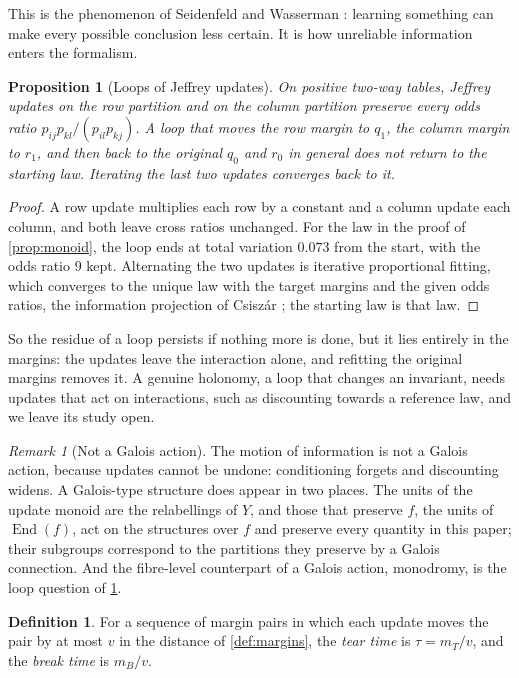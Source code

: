 \documentclass[11pt]{article}
\newtheorem{proposition}[theorem]{Proposition}
\theoremstyle{definition}
\newtheorem{definition}[theorem]{Definition}
\theoremstyle{remark}
\newtheorem{remark}[theorem]{Remark}
\begin{document}
This is the phenomenon of Seidenfeld and Wasserman \cite{SeidenfeldWasserman1993}: learning something can make every
possible conclusion less certain. It is how unreliable information enters the formalism.

\begin{proposition}[Loops of Jeffrey updates]\label{prop:loop}
On positive two-way tables, Jeffrey updates on the row partition and on the column partition preserve every odds ratio
$p_{ij}p_{kl}/(p_{il}p_{kj})$. A loop that moves the row margin to $q_1$, the column margin to $r_1$, and then back to the
original $q_0$ and $r_0$ in general does not return to the starting law. Iterating the last two updates converges back to it.
\end{proposition}
\begin{proof}
A row update multiplies each row by a constant and a column update each column, and both leave cross ratios unchanged. For
the law in the proof of \cref{prop:monoid}, the loop ends at total variation $0.073$ from the start, with the odds ratio $9$ kept.
Alternating the two updates is iterative proportional fitting, which converges to the unique law with the target margins and the
given odds ratios, the information projection of Csiszár \cite{Csiszar1975}; the starting law is that law.
\end{proof}

So the residue of a loop persists if nothing more is done, but it lies entirely in the margins: the updates leave the interaction
alone, and refitting the original margins removes it. A genuine holonomy, a loop
that changes an invariant, needs updates that act on interactions, such as discounting towards a reference law, and we leave
its study open.

\begin{remark}[Not a Galois action]\label{rem:galois}
The motion of information is not a Galois action, because updates cannot be undone: conditioning forgets and discounting
widens. A Galois-type structure does appear in two places. The units of the update monoid are the relabellings of $Y$, and those that preserve $f$,
the units of $\operatorname{End}(f)$, act on the structures over $f$ and preserve every quantity in this paper; their subgroups
correspond to the partitions they preserve by a Galois connection. And the fibre-level counterpart of a Galois action, monodromy, is the loop question of
\cref{prop:loop}.
\end{remark}

\begin{definition}\label{def:teartime}
For a sequence of margin pairs in which each update moves the pair by at most $v$ in the distance of \cref{def:margins}, the
\emph{tear time} is $\tau=m_T/v$, and the \emph{break time} is $m_B/v$.
\end{definition}
\end{document}

